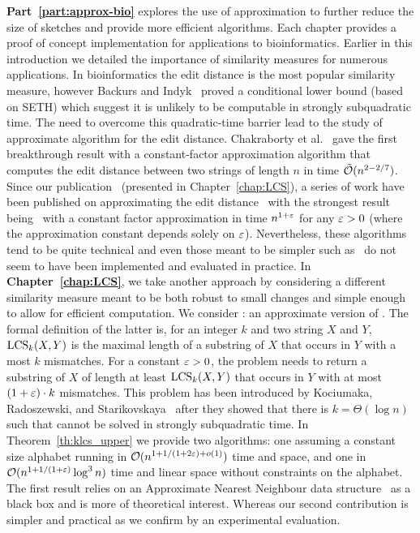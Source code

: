 \textbf{Part~\ref{part:approx-bio}} explores the use of approximation to further reduce the size of sketches and provide more efficient algorithms. Each chapter provides a proof of concept implementation for applications to bioinformatics.
%
Earlier in this introduction we detailed the importance of similarity measures for numerous applications.
In bioinformatics the edit distance is the most popular similarity measure, however Backurs and Indyk~\cite{DBLP:conf/stoc/BackursI15} proved a conditional lower bound (based on SETH) which suggest it is unlikely to be computable in strongly subquadratic time.
The need to overcome this quadratic-time barrier lead to the study of approximate algorithm for the edit distance. Chakraborty et al.~\cite{DBLP:conf/focs/ChakrabortyDGKS18} gave the first breakthrough result with a constant-factor approximation algorithm that computes the edit distance between two strings of length $n$ in time $\tilde{\mathcal{O}}(n^{2-2/7})$.
Since our publication~\cite{DBLP:conf/cpm/GourdelKRS20} (presented in Chapter~\ref{chap:LCS}), a series of work have been published on approximating the edit distance~\cite{brakensiek2020constant,koucky2020constant} with the strongest result being~\cite{andoni2020edit} with a constant factor approximation in time $n^{1+\varepsilon}$ for any $\varepsilon>0$ (where the approximation constant depends solely on $\varepsilon$).
Nevertheless, these algorithms tend to be quite technical and even those meant to be simpler such as~\cite{andoni2020simple} do not seem to have been implemented and evaluated in practice.
In \textbf{Chapter~\ref{chap:LCS}}, we take another approach by considering a different similarity measure meant to be both robust to small changes and simple enough to allow for efficient computation. We consider \kApproxLCS: an approximate version of \kLCS. The formal definition of the latter is, for an integer $k$ and two string $X$ and $Y$, $\mathrm{LCS}_{k}(X,Y)$ is the maximal length of a substring of $X$ that occurs in $Y$ with a most $k$ mismatches.
For a constant $\varepsilon > 0$, the \kApproxLCS problem needs to return a substring of $X$ of length at least $\mathrm{LCS}_{k}(X,Y)$ that occurs in $Y$ with at most $(1+\varepsilon) \cdot k$ mismatches. This problem has been introduced by Kociumaka, Radoszewski, and Starikovskaya~\cite{DBLP:journals/algorithmica/KociumakaRS19} after they showed that there is $k=\Theta(\log n)$ such that \kLCS cannot be solved in strongly subquadratic time.
In Theorem~\ref{th:klcs_upper} we provide two algorithms: one assuming a constant size alphabet running in $\mathcal{O}(n^{1+ 1/(1+2\varepsilon) + o(1)})$ time and space, and one in $\mathcal{O}(n^{1+1/(1+\varepsilon)} \log^3 n)$ time and linear space without constraints on the alphabet. The first result relies on an Approximate Nearest Neighbour data structure~\cite{DBLP:conf/stoc/AndoniR15} as a black box and is more of theoretical interest. Whereas our second contribution is simpler and practical as we confirm by an experimental evaluation.
